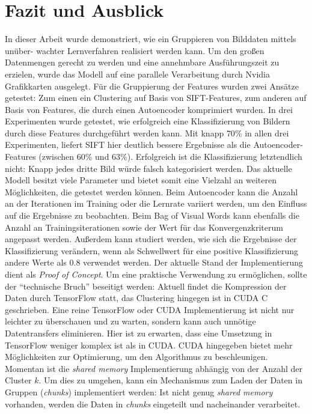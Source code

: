 \chapter{Fazit und Ausblick}

In dieser Arbeit wurde demonstriert, wie ein Gruppieren von Bilddaten mittels unüber- wachter Lernverfahren realisiert werden kann. Um den großen Datenmengen gerecht zu werden und eine annehmbare Ausführungszeit zu erzielen, wurde das Modell auf eine parallele Verarbeitung durch Nvidia Grafikkarten ausgelegt. Für die Gruppierung der Features wurden zwei Ansätze getestet: Zum einen ein Clustering auf Basis von SIFT-Features, zum anderen auf Basis von Features, die durch einen Autoencoder komprimiert wurden. In drei Experimenten wurde getestet, wie erfolgreich eine Klassifizierung von Bildern durch diese Features durchgeführt werden kann. Mit knapp $70$\% in allen drei Experimenten, liefert SIFT hier deutlich bessere Ergebnisse als die Autoencoder-Features (zwischen $60$\% und $63$\%). Erfolgreich ist die Klassifizierung letztendlich nicht: Knapp jedes dritte Bild würde falsch kategorisiert werden.\newline
Das aktuelle Modell besitzt viele Parameter und bietet somit eine Vielzahl an weiteren Möglichkeiten, die getestet werden können. Beim Autoencoder kann die Anzahl an der Iterationen im Training oder die Lernrate variiert werden, um den Einfluss auf die Ergebnisse zu beobachten. Beim Bag of Visual Words kann ebenfalls die Anzahl an Trainingsiterationen sowie der Wert für das Konvergenzkriterum angepasst werden. Außerdem kann studiert werden, wie sich die Ergebnisse der Klassifizierung verändern, wenn als Schwellwert für eine positive Klassifizierung andere Werte als $0.8$ verwendet werden.\newline
Der aktuelle Stand der Implementierung dient als \textit{Proof of Concept}. Um eine praktische Verwendung zu ermöglichen, sollte der \enquote{technische Bruch} beseitigt werden: Aktuell findet die Kompression der Daten durch TensorFlow statt, das Clustering hingegen ist in CUDA C geschrieben. Eine reine TensorFlow oder CUDA Implementierung ist nicht nur leichter zu überschauen und zu warten, sondern kann auch unnötige Datentransfers eliminieren. Hier ist zu erwarten, dass eine Umsetzung in TensorFlow weniger komplex ist als in CUDA. CUDA hingegeben bietet mehr Möglichkeiten zur Optimierung, um den Algorithmus zu beschleunigen. Momentan ist die \textit{shared memory} Implementierung abhängig von der Anzahl der Cluster $k$. Um dies zu umgehen, kann ein Mechanismus zum Laden der Daten in Gruppen (\textit{chunks}) implementiert werden: Ist nicht genug \textit{shared memory} vorhanden, werden die Daten in \textit{chunks} eingeteilt und nacheinander verarbeitet.